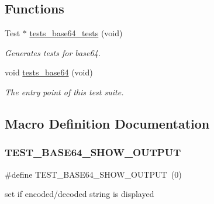 \subsection*{Functions}
\begin{DoxyCompactItemize}
\item 
Test $\ast$ \hyperlink{group__unittests_ga7104265274747d0e2711d4f44feb9362}{tests\+\_\+base64\+\_\+tests} (void)
\begin{DoxyCompactList}\small\item\em Generates tests for base64. \end{DoxyCompactList}\item 
void \hyperlink{group__unittests_gad8db0d2b50c5b552f0173f6e55cc21b4}{tests\+\_\+base64} (void)
\begin{DoxyCompactList}\small\item\em The entry point of this test suite. \end{DoxyCompactList}\end{DoxyCompactItemize}


\subsection{Macro Definition Documentation}
\mbox{\label{tests-base64_8c_a892fe6a6f4c4da92824f99a59dd4229b}} 
\subsubsection{\texorpdfstring{T\+E\+S\+T\+\_\+\+B\+A\+S\+E64\+\_\+\+S\+H\+O\+W\+\_\+\+O\+U\+T\+P\+UT}{TEST\_BASE64\_SHOW\_OUTPUT}}
{\footnotesize\ttfamily \#define T\+E\+S\+T\+\_\+\+B\+A\+S\+E64\+\_\+\+S\+H\+O\+W\+\_\+\+O\+U\+T\+P\+UT~(0)}

set if encoded/decoded string is displayed 